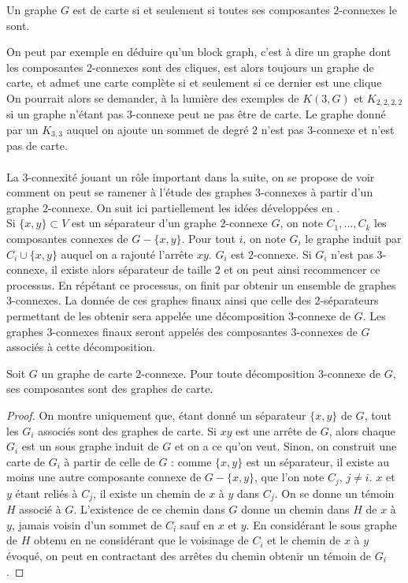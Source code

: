 \documentclass{scrartcl}
\begin{document}
\begin{flushleft}
\begin{prop}\label{suffbiconn}\cite{FptMap}
    Un graphe $G$ est de carte si et seulement si toutes ses composantes $2$-connexes le sont.
\end{prop}

On peut par exemple en déduire qu'un block graph, c'est à dire un graphe dont les composantes $2$-connexes sont des cliques,
est alors toujours un graphe de carte, et admet une carte complète si et seulement si ce dernier est une clique\\
On pourrait alors se demander, à la lumière des exemples de $K(3,G)$ et $K_{2,2,2,2}$ si un graphe n'étant pas $3$-connexe
peut ne pas être de carte. Le graphe donné par un $K_{3,3}$ auquel on ajoute un sommet de degré $2$ n'est pas $3$-connexe
et n'est pas de carte.
\\~\\
La $3$-connexité jouant un rôle important dans la suite, on se propose de voir comment on peut se ramener à l'étude des
graphes $3$-connexes à partir d'un graphe $2$-connexe. On suit ici partiellement les idées développées en \cite{3connComp}.\\
Si $\{x,y\} \subset V$ est un séparateur d'un graphe $2$-connexe $G$, on note $C_1, ..., C_k$ les composantes connexes de
$G - \{x,y\}$. Pour tout $i$, on note $G_i$ le graphe induit par $C_i \cup \{x,y\}$ auquel on a rajouté l'arrête $xy$.
$G_i$ est $2$-connexe. Si $G_i$ n'est pas $3$-connexe, il existe alors séparateur de taille $2$ et on peut ainsi recommencer
ce processus. En répétant ce processus, on finit par obtenir un ensemble de graphes $3$-connexes. La donnée de ces graphes finaux
ainsi que celle des $2$-séparateurs permettant de les obtenir sera appelée une décomposition $3$-connexe de $G$.
Les graphes $3$-connexes finaux seront appelés des composantes $3$-connexes de $G$ associés à cette décomposition.

\begin{prop}\label{3connCompCarte}
    Soit $G$ un graphe de carte $2$-connexe. Pour toute décomposition $3$-connexe de $G$, ses composantes sont des graphes de carte.
\end{prop}

\begin{proof}
    On montre uniquement que, étant donné un séparateur $\{x,y\}$ de $G$, tout les $G_i$ associés sont des graphes de carte.
    Si $xy$ est une arrête de $G$, alors chaque $G_i$ est un sous graphe induit de $G$ et on a ce qu'on veut. Sinon, on construit une
    carte de $G_i$ à partir de celle de $G$ : comme $\{x,y\}$ est un séparateur, il existe au moins une autre composante connexe de
    $G - \{x,y\}$, que l'on note $C_j$, $j \neq i$. $x$ et $y$ étant reliés à $C_j$, il existe un chemin de $x$ à $y$ dans $C_j$.
    On se donne un témoin $H$ associé à $G$. L'existence de ce chemin dans $G$ donne un chemin dans $H$ de $x$ à $y$, jamais voisin
    d'un sommet de $C_i$ sauf en $x$ et $y$. En considérant le sous graphe de $H$ obtenu en ne considérant que le voisinage de $C_i$ et le chemin
    de $x$ à $y$ évoqué, on peut en contractant des arrêtes du chemin obtenir un témoin de $G_i$.
\end{proof}


\end{flushleft}
\end{document}
